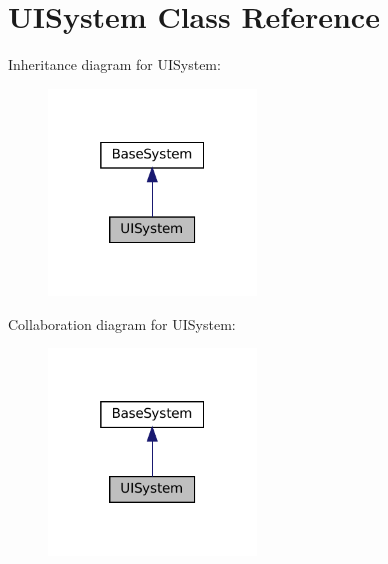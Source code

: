 \hypertarget{classUISystem}{}\section{U\+I\+System Class Reference}
\label{classUISystem}


Inheritance diagram for U\+I\+System\+:
\nopagebreak
\begin{figure}[H]
\begin{center}
\leavevmode
\includegraphics[width=157pt]{classUISystem__inherit__graph}
\end{center}
\end{figure}


Collaboration diagram for U\+I\+System\+:
\nopagebreak
\begin{figure}[H]
\begin{center}
\leavevmode
\includegraphics[width=157pt]{classUISystem__coll__graph}
\end{center}
\end{figure}
